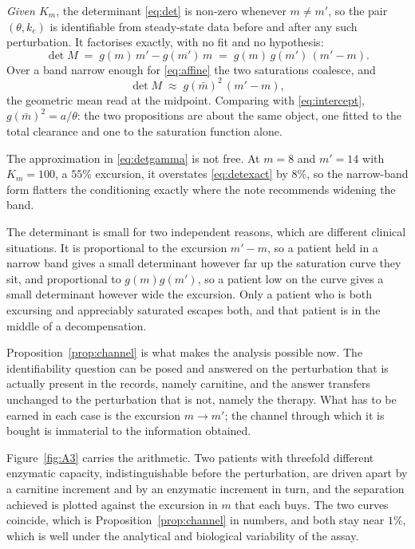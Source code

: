 \begin{proposition}
\label{prop:illcond}
\emph{Given $K_m$}, the determinant \eqref{eq:det} is non-zero whenever $m \neq m'$, so the
pair $(\theta, k_e)$ is identifiable from steady-state data before and after any such
perturbation. It factorises exactly, with no fit and no hypothesis:
\begin{equation}
\det M \;=\; g(m)\,m' - g(m')\,m \;=\; g(m)\,g(m')\,(m' - m).
\label{eq:detexact}
\end{equation}
Over a band narrow enough for \eqref{eq:affine} the two saturations coalesce, and
\begin{equation}
\det M \;\approx\; g(\bar m)^2\,(m' - m),
\label{eq:detgamma}
\end{equation}
the geometric mean read at the midpoint. Comparing with \eqref{eq:intercept},
$g(\bar m)^2 = a/\theta$: the two propositions are about the same object, one fitted to the
total clearance and one to the saturation function alone.
\end{proposition}

The approximation in \eqref{eq:detgamma} is not free. At $m = 8$ and $m' = 14$ with
$K_m = 100$, a $55\%$ excursion, it overstates \eqref{eq:detexact} by $8\%$, so the
narrow-band form flatters the conditioning exactly where the note recommends widening the
band.

The determinant is small for two independent reasons, which are different clinical
situations. It is proportional to the excursion $m' - m$, so a patient held in a narrow band
gives a small determinant however far up the saturation curve they sit, and proportional to
$g(m)g(m')$, so a patient low on the curve gives a small determinant however wide the
excursion. Only a patient who is
both excursing and appreciably saturated escapes both, and that patient is in the middle of a
decompensation.

Proposition~\ref{prop:channel} is what makes the analysis possible now. The identifiability
question can be posed and answered on the perturbation that is actually present in the
records, namely carnitine, and the answer transfers unchanged to the perturbation that is
not, namely the therapy. What has to be earned in each case is the excursion $m \to m'$;
the channel through which it is bought is immaterial to the information obtained.

Figure~\ref{fig:A3} carries the arithmetic. Two patients with threefold different
enzymatic capacity, indistinguishable before the perturbation, are driven apart by a
carnitine increment and by an enzymatic increment in turn, and the separation achieved is
plotted against the excursion in $m$ that each buys. The two curves coincide, which is
Proposition~\ref{prop:channel} in numbers, and both stay near $1\%$, which is well under
the analytical and biological variability of the assay.


